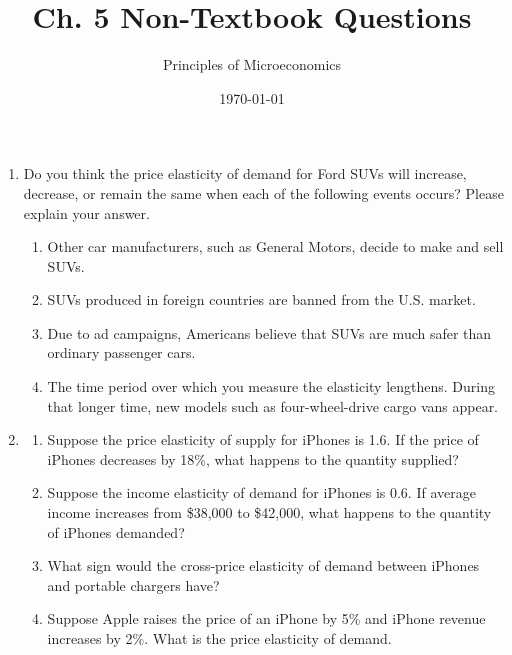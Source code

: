 \documentclass{article}
\title{Ch. 5 Non-Textbook Questions}
\author{Principles of Microeconomics}
\date{\today}
\begin{document}
\maketitle

\begin{enumerate}

\item Do you think the price elasticity of demand for Ford SUVs will increase, decrease, or remain the same when each of the following events occurs? Please explain your answer.

	\begin{enumerate}
	
	\item Other car manufacturers, such as General Motors, decide to make and sell SUVs.
	
	\item SUVs produced in foreign countries are banned from the U.S. market.
	
	\item Due to ad campaigns, Americans believe that SUVs are much safer than ordinary passenger cars.
	
	\item The time period over which you measure the elasticity lengthens. During that longer time, new models such as four-wheel-drive cargo vans appear.
	
	\end{enumerate}
	
\item 

	\begin{enumerate}
	
	\item Suppose the price elasticity of supply for iPhones is 1.6. If the price of iPhones decreases by 18\%, what happens to the quantity supplied?
	
	\item Suppose the income elasticity of demand for iPhones is 0.6. If average income increases from \$38,000 to \$42,000, what happens to the quantity of iPhones demanded?
	
	\item What sign would the cross-price elasticity of demand between iPhones and portable chargers have?
	
	\item Suppose Apple raises the price of an iPhone by 5\% and iPhone revenue increases by 2\%. What is the price elasticity of demand. 
	
	\end{enumerate}
	

\end{enumerate}
\end{document}
